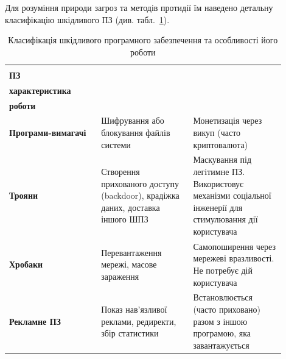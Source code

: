 Для розуміння природи загроз та методів протидії їм наведено детальну класифікацію шкідливого ПЗ (див. табл.~\ref{tab:table6_1}).

\begin{table}[H]
    \centering
    \footnotesize
    \caption{Класифікація шкідливого програмного забезпечення та особливості його роботи}
    \label{tab:table6_1}
    \renewcommand{\arraystretch}{1.05}
    \begin{tabular}{|>{\raggedright\arraybackslash}p{0.30\linewidth}|>{\raggedright\arraybackslash}p{0.30\linewidth}|>{\raggedright\arraybackslash}p{0.30\linewidth}|}
        \hline
        \multicolumn{1}{|c|}{\shortstack{\textbf{Вид шкідливого} \\ \textbf{ПЗ}}} & \multicolumn{1}{c|}{\shortstack{\textbf{Технічна} \\ \textbf{характеристика}}} & \multicolumn{1}{c|}{\shortstack{\textbf{Особливості} \\ \textbf{роботи}}} \\
        \hline
        \textbf{Програми-вимагачі} & Шифрування або блокування файлів системи & Монетизація через викуп (часто криптовалюта) \\
        \hline
        \textbf{Трояни} & Створення прихованого доступу (backdoor), крадіжка даних, доставка іншого ШПЗ & Маскування під легітимне ПЗ. Використовує механізми соціальної інженерії для стимулювання дії користувача \\
        \hline
        \textbf{Хробаки} & Перевантаження мережі, масове зараження & Самопоширення через мережеві вразливості. Не потребує дій користувача \\
        \hline
        \textbf{Рекламне ПЗ} & Показ нав'язливої реклами, редиректи, збір статистики & Встановлюється (часто приховано) разом з іншою програмою, яка завантажується \\
        \hline
    \end{tabular}
\end{table}




